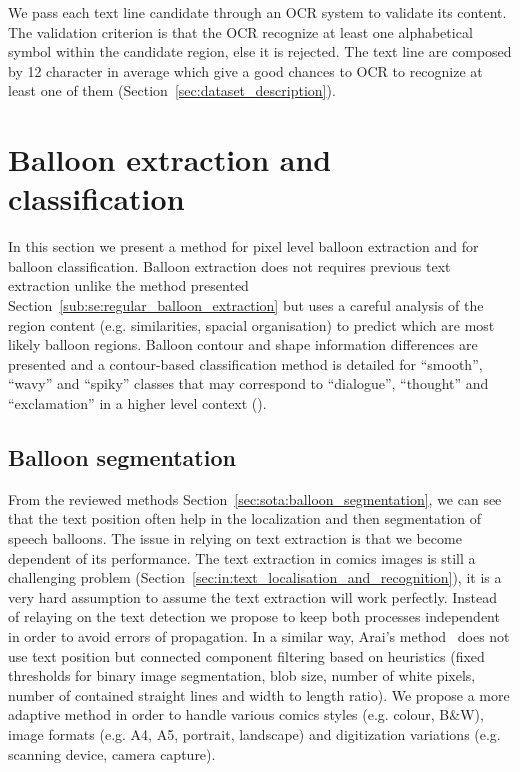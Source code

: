 We pass each text line candidate through an OCR system to validate its content.
The validation criterion is that the OCR recognize at least one alphabetical symbol within the candidate region, else it is rejected.
The text line are composed by 12 character in average which give a good chances to OCR to recognize at least one of them (Section~\ref{sec:dataset_description}).




\section{Balloon extraction and classification}
\label{sec:in:balloon}

In this section we present a method for pixel level balloon extraction and for balloon classification.
Balloon extraction does not requires previous text extraction unlike the method presented Section~\ref{sub:se:regular_balloon_extraction} but uses a careful analysis of the region content (e.g. similarities, spacial organisation) to predict which are most likely balloon regions.
Balloon contour and shape information differences are presented and a contour-based classification method is detailed for ``smooth'', ``wavy'' and ``spiky'' classes that may correspond to ``dialogue'', ``thought'' and ``exclamation'' in a higher level context ().

\subsection{Balloon segmentation} %
\label{sub:in:balloon_segmentation}
From the reviewed methods Section~\ref{sec:sota:balloon_segmentation}, we can see that the text position often help in the localization and then segmentation of speech balloons.
The issue in relying on text extraction is that we become dependent of its performance.
The text extraction in comics images is still a challenging problem (Section~\ref{sec:in:text_localisation_and_recognition}), it is a very hard assumption to assume the text extraction will work perfectly. 
Instead of relaying on the text detection we propose to keep both processes independent in order to avoid errors of propagation.
In a similar way, Arai's method~\cite{Arai11} does not use text position but connected component filtering based on heuristics (fixed thresholds for binary image segmentation, blob size, number of white pixels, number of contained straight lines and width to length ratio). 
We propose a more adaptive method in order to handle various comics styles (e.g. colour, B\&W), image formats (e.g. A4, A5, portrait, landscape) and digitization variations (e.g. scanning device, camera capture).

